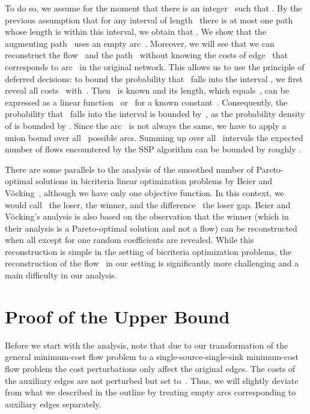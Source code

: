 \documentclass[11pt]{article}
\begin{document}
To do so, we assume for the moment that there is an integer~ such that .
By the previous assumption that for any interval of length~ there is at most
one path whose length is within this interval, we obtain that . We show that the augmenting path~ uses an empty arc~. Moreover, we
will see that we can reconstruct the flow~ and the path~ without knowing the costs of
edge~ that corresponds to arc~ in the original network.
This allows us to use the principle of deferred decisions: to bound the probability that~ falls into the interval , we first reveal all costs~
with~. Then~ is known and its length, which equals~, can be expressed
as a linear function~ or~ for a known constant~. 
Consequently, the probability that~ falls into the interval  is bounded by~, as the probability density of  is bounded by .
Since the arc~ is not always the same, we have to apply a union bound over all~ possible arcs. Summing up over all~ intervals the expected number of flows encountered by the SSP algorithm can be bounded by roughly .

There are some parallels to the analysis of the smoothed number of Pareto-optimal solutions in bicriteria linear optimization problems by Beier and V\"ocking~\cite{DBLP:journals/siamcomp/BeierV06}, although we have only one objective function.
In this context, we would call~ the loser,  the winner, and the difference~ the loser gap. Beier and V\"ocking's analysis is also based on the observation
that the winner (which in their analysis is a Pareto-optimal solution and not a flow) can be reconstructed when all except for one random coefficients are revealed.
While this reconstruction is simple in the setting of bicriteria optimization problems, the reconstruction of the flow~  in our setting is significantly more challenging and a main
difficulty in our analysis.

\section{Proof of the Upper Bound}
\label{sec:analysis}

Before we start with the analysis, note that due to our transformation of the general minimum-cost flow problem to a single-source-single-sink minimum-cost flow problem the cost perturbations only affect the original edges. The costs of the auxiliary edges are not perturbed but set to~. Thus, we will slightly deviate from what we described in the outline by treating empty arcs corresponding to auxiliary edges separately.
\end{document}
